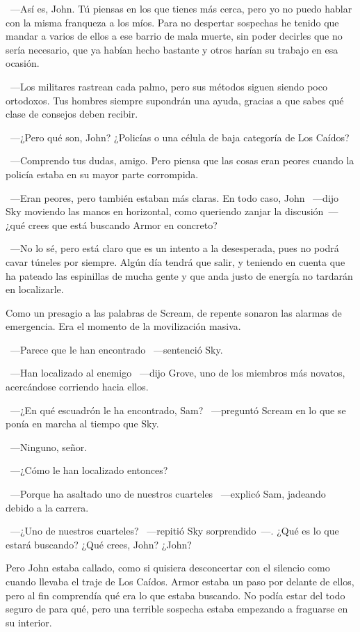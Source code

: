 ~---Así es, John. Tú piensas en los que tienes más cerca, pero yo no puedo hablar con la misma franqueza a los míos. Para no despertar sospechas he tenido que mandar a varios de ellos a ese barrio de mala muerte, sin poder decirles que no sería necesario, que ya habían hecho bastante y otros harían su trabajo en esa ocasión.

~---Los militares rastrean cada palmo, pero sus métodos siguen siendo poco ortodoxos. Tus hombres siempre supondrán una ayuda, gracias a que sabes qué clase de consejos deben recibir.

~---¿Pero qué son, John? ¿Policías o una célula de baja categoría de Los Caídos?

~---Comprendo tus dudas, amigo. Pero piensa que las cosas eran peores cuando la policía estaba en su mayor parte corrompida.

~---Eran peores, pero también estaban más claras. En todo caso, John ~---dijo Sky moviendo las manos en horizontal, como queriendo zanjar la discusión~--- ¿qué crees que está buscando Armor en concreto?

~---No lo sé, pero está claro que es un intento a la desesperada, pues no podrá cavar túneles por siempre. Algún día tendrá que salir, y teniendo en cuenta que ha pateado las espinillas de mucha gente y que anda justo de energía no tardarán en localizarle.

Como un presagio a las palabras de Scream, de repente sonaron las alarmas de emergencia. Era el momento de la movilización masiva.

~---Parece que le han encontrado ~---sentenció Sky.

~---Han localizado al enemigo ~---dijo Grove, uno de los miembros más novatos, acercándose corriendo hacia ellos.

~---¿En qué escuadrón le ha encontrado, Sam? ~---preguntó Scream en lo que se ponía en marcha al tiempo que Sky.

~---Ninguno, señor.

~---¿Cómo le han localizado entonces?

~---Porque ha asaltado uno de nuestros cuarteles ~---explicó Sam, jadeando debido a la carrera.

~---¿Uno de nuestros cuarteles? ~---repitió Sky sorprendido~---. ¿Qué es lo que estará buscando? ¿Qué crees, John? ¿John?

Pero John estaba callado, como si quisiera desconcertar con el silencio como cuando llevaba el traje de Los Caídos. Armor estaba un paso por delante de ellos, pero al fin comprendía qué era lo que estaba buscando. No podía estar del todo seguro de para qué, pero una terrible sospecha estaba empezando a fraguarse en su interior.

